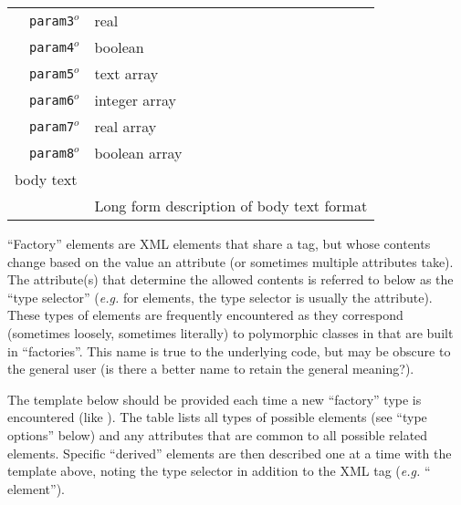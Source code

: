 \begin{table}[h]
\begin{center}
\begin{tabularx}{\textwidth}{l l l l l l }
   &   \texttt{param3}$^o$&  real              &                  &                     &                       \\
   &   \texttt{param4}$^o$&  boolean           &                  &                     &                       \\
   &   \texttt{param5}$^o$&  text array        &                  &                     &                       \\
   &   \texttt{param6}$^o$&  integer array     &                  &                     &                       \\
   &   \texttt{param7}$^o$&  real array        &                  &                     &                       \\
   &   \texttt{param8}$^o$&  boolean array     &                  &                     &                       \\
\multicolumn{2}{l}{body text}  & \multicolumn{4}{l}{}\\
   &                           & \multicolumn{4}{l}{Long form description of body text format}                   \\
  \hline
\end{tabularx}
\end{center}
\end{table}
\FloatBarrier



``Factory'' elements are XML elements that share a tag, but whose contents change based on the value an attribute (or sometimes multiple attributes take).  The attribute(s) that determine the allowed contents is referred to below as the ``type selector''  (\textit{e.g.} for  elements, the type selector is usually the  attribute).  These types of elements are frequently encountered as they correspond (sometimes loosely, sometimes literally) to polymorphic classes in \qmcpack that are built in ``factories''.  This name is true to the underlying code, but may be obscure to the general user (is there a better name to retain the general meaning?).   

The template below should be provided each time a new ``factory'' type is encountered (like ).  The table lists all types of possible elements (see ``type options'' below) and any attributes that are common to all possible related elements.  Specific ``derived'' elements are then described one at a time with the template above, noting the type selector in addition to the XML tag (\textit{e.g.} `` element'').

